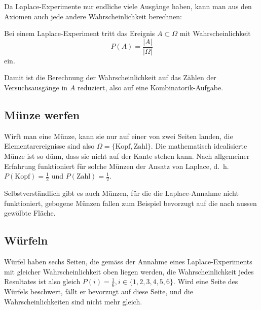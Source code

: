 Da Laplace-Experimente nur endliche viele Ausgänge haben, kann man aus
den Axiomen auch jede andere Wahrscheinlichkeit berechnen:

\begin{satz}
Bei einem Laplace-Experiment tritt das Ereignis $A\subset\Omega$ mit
Wahrscheinlichkeit
\[
P(A)=\frac{|A|}{|\Omega|}
\]
ein.
\end{satz}
Damit ist die Berechnung der Wahrscheinlichkeit auf das Zählen der 
Versuchsausgänge in $A$ reduziert, also auf eine Kombinatorik-Aufgabe.

\subsection{Münze werfen}
Wirft man eine Münze, kann sie nur auf einer von zwei Seiten landen,
die Elementarereignisse sind also $\Omega = \{\text{Kopf}, \text{Zahl}\}$.
Die mathematisch idealisierte Münze ist so dünn, dass sie nicht auf
der Kante stehen kann.
Nach allgemeiner Erfahrung funktioniert für
solche Münzen der Ansatz von Laplace, d.~h.~$P(\text{Kopf}) = \frac12$
und $P(\text{Zahl})=\frac12$.

Selbstverständlich gibt es auch Münzen, für die die Laplace-Annahme
nicht funktioniert, gebogene Münzen fallen zum Beispiel bevorzugt auf die
nach aussen gewölbte Fläche.

\subsection{Würfeln}
Würfel haben sechs Seiten, die gemäss der Annahme eines Laplace-Experiments
mit gleicher
Wahrscheinlichkeit oben liegen werden, die Wahrscheinlichkeit jedes
Resultates ist also gleich $P(i) = \frac16, i\in\{1,2,3,4,5,6\}$.
Wird eine Seite des Würfels beschwert, fällt er bevorzugt auf diese
Seite, und die Wahrscheinlichkeiten sind nicht mehr gleich.

